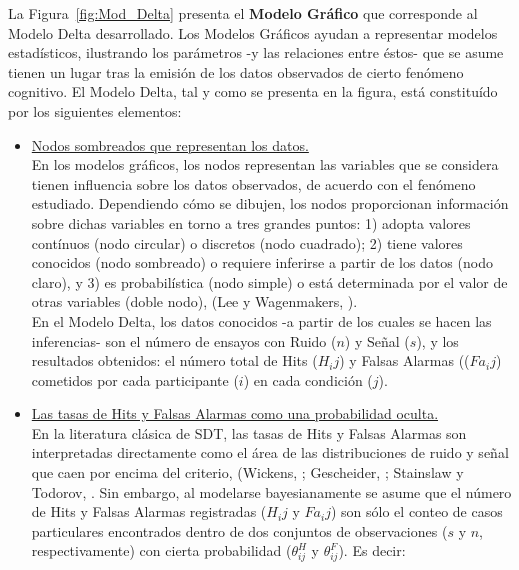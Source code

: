 La Figura~\ref{fig:Mod_Delta} presenta el \textbf{Modelo Gráfico} que corresponde al Modelo Delta desarrollado. Los Modelos Gráficos ayudan a representar modelos estadísticos, ilustrando los parámetros -y las relaciones entre éstos- que se asume tienen un lugar tras la emisión de los datos observados de cierto fenómeno cognitivo. El Modelo Delta, tal y como se presenta en la figura, está constituído por los siguientes elementos:\\

\begin{itemize}
\item \underline{Nodos sombreados que representan los datos.}\\

En los modelos gráficos, los nodos representan las variables que se considera tienen influencia sobre los datos observados, de acuerdo con el fenómeno estudiado. Dependiendo cómo se dibujen, los nodos proporcionan información sobre dichas variables en torno a tres grandes puntos: 1) adopta valores contínuos (nodo circular) o discretos (nodo cuadrado); 2) tiene valores conocidos (nodo sombreado) o requiere inferirse a partir de los datos (nodo claro), y 3) es probabilística (nodo simple) o está determinada por el valor de otras variables (doble nodo), (Lee y Wagenmakers, \citeyear{LeeBook}).\\

En el Modelo Delta, los datos conocidos -a partir de los cuales se hacen las inferencias- son el número de ensayos con Ruido ($n$) y Señal ($s$), y los resultados obtenidos: el número total de Hits ($H_ij$) y Falsas Alarmas (($Fa_ij$) cometidos por cada participante ($i$) en cada condición ($j$).\\

\item \underline{Las tasas de Hits y Falsas Alarmas como una probabilidad oculta.}\\ 

En la literatura clásica de SDT, las tasas de Hits y Falsas Alarmas son interpretadas directamente como el área de las distribuciones de ruido y señal que caen por encima del criterio, (Wickens, \citeyear{Wickens1}; Gescheider, \citeyear{Gescheider}; Stainslaw y Todorov, \citeyear{Stainslaw1999}. Sin embargo, al modelarse bayesianamente se asume que el número de Hits y Falsas Alarmas registradas ($H_ij$ y $Fa_ij$) son sólo el conteo de casos particulares encontrados dentro de dos conjuntos de observaciones ($s$ y $n$, respectivamente) con cierta probabilidad ($\theta^H_{ij}$ y $\theta^F_{ij}$). Es decir:


\end{itemize}
